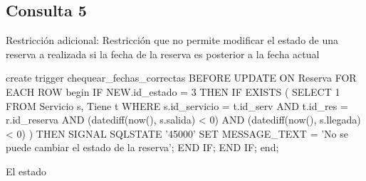 \newpage

\subsection*{Consulta 5}

Restricción adicional: Restricción que no permite modificar el estado de una reserva a realizada 
si la fecha de la reserva es posterior a la fecha actual


\begin{small}
\begin{verbatimtab}[2]
create trigger chequear_fechas_correctas
BEFORE UPDATE ON Reserva
FOR EACH ROW
begin
    IF NEW.id_estado = 3 THEN
        IF EXISTS (
            SELECT 1
            FROM Servicio s, Tiene t
            WHERE
                s.id_servicio = t.id_serv AND
                t.id_res = r.id_reserva AND
                (datediff(now(), s.salida) < 0) AND
                (datediff(now(), s.llegada) < 0)
        ) THEN
            SIGNAL SQLSTATE '45000'
                SET MESSAGE_TEXT =
                    'No se puede cambiar el  estado de la reserva';
        END IF;
    END IF;
end;
\end{verbatimtab}
\end{small}

El estado